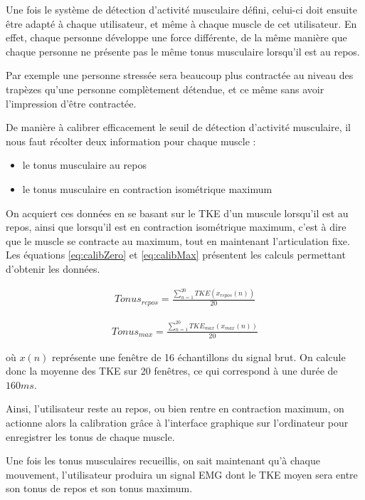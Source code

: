 \documentclass[letterpaper, twoside, 12pt, memoire, creativecommons, hyperref]{thETS}
\begin{document}
Une fois le système de détection d'activité musculaire défini, celui-ci doit ensuite être adapté à chaque utilisateur, et même à chaque muscle de cet utilisateur. En effet, chaque personne développe une force différente, de la même manière que chaque personne ne présente pas le même tonus musculaire lorsqu'il est au repos. 

Par exemple une personne stressée sera beaucoup plus contractée au niveau des trapèzes qu'une personne complètement détendue, et ce même sans avoir l'impression d'être contractée.

De manière à calibrer efficacement le seuil de détection d'activité musculaire, il nous faut récolter deux information pour chaque muscle : 

\begin{itemize}
 \item le tonus musculaire au repos
 \item le tonus musculaire en contraction isométrique maximum
\end{itemize}

On acquiert ces données en se basant sur le TKE d'un muscule lorsqu'il est au repos, ainsi que lorsqu'il est en contraction isométrique maximum, c'est à dire que le muscle se contracte au maximum, tout en maintenant l'articulation fixe. Les équations \ref{eq:calibZero} et \ref{eq:calibMax} présentent les calculs permettant d'obtenir les données.

\begin{align}\label{eq:calibZero}
   Tonus_{repos} = \frac{\sum_{n=1}^{20}TKE(x_{repos}(n))}{20} 
\end{align}

\begin{align}\label{eq:calibMax}
   Tonus_{max} = \frac{\sum_{n=1}^{20}TKE_{max}(x_{max}(n))}{20} 
\end{align}

où $x(n)$ représente une fenêtre de 16 échantillons du signal brut. On calcule donc la moyenne des TKE sur 20 fenêtres, ce qui correspond à une durée de $160ms$. 

Ainsi, l'utilisateur reste au repos, ou bien rentre en contraction maximum, on actionne alors la calibration grâce à l'interface graphique sur l'ordinateur pour enregistrer les tonus de chaque muscle.

Une fois les tonus musculaires recueillis, on sait maintenant qu'à chaque mouvement, l'utilisateur produira un signal EMG dont le TKE moyen sera entre son tonus de repos et son tonus maximum. 
\end{document}
